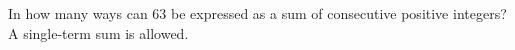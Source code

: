 In how many ways can $63$ be expressed as a sum of consecutive positive integers? A single-term sum is allowed.
